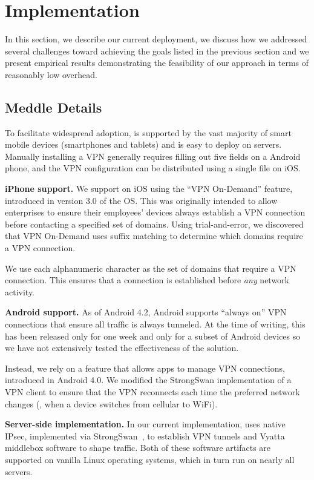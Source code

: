 \section{Implementation}
In this section, we describe our current deployment, we discuss how we addressed several 
challenges toward achieving the goals listed in the previous section and 
we present empirical results demonstrating the feasibility of our approach 
in terms of reasonably low overhead. 

\subsection{Meddle Details}
To facilitate widespread adoption, \meddle is
supported by the vast majority of smart mobile devices (smartphones and tablets) and 
is easy to deploy on servers. Manually installing a VPN generally requires filling out five
fields on a Android phone, and the VPN configuration can be
distributed using a single file on iOS. 


\noindent\textbf{iPhone support.} We support \meddle on iOS using the ``VPN On-Demand'' feature, 
introduced in version 3.0 of the OS. This was originally intended to allow enterprises to 
ensure their employees' devices always establish a VPN connection before contacting 
a specified set of domains. Using trial-and-error, we discovered that VPN On-Demand uses 
suffix matching to determine which domains require a VPN connection. 

We use each alphanumeric character as the set of domains that require a VPN 
connection. This ensures that a connection is established before \emph{any} network 
activity.

\noindent\textbf{Android support.} As of Android 4.2, Android supports 
``always on'' VPN connections that ensure all traffic is always tunneled. 
At the time of writing, this has been released only for one week and only 
for a subset of Android devices so we have not extensively tested the 
effectiveness of the solution. 

Instead, we rely on a feature that allows apps to manage VPN connections, 
introduced in Android 4.0. We modified the StrongSwan implementation of 
a VPN client to ensure that the VPN reconnects each time the preferred 
network changes (\eg, when a device switches from cellular to WiFi). 

\noindent\textbf{Server-side implementation.} In our current implementation, \meddle 
uses native IPsec, implemented via StrongSwan~\cite{strongswan}, to establish VPN tunnels 
and Vyatta middlebox software to shape
traffic. Both of these software artifacts are supported on vanilla
Linux operating systems, which in turn run on nearly all servers. 
   
